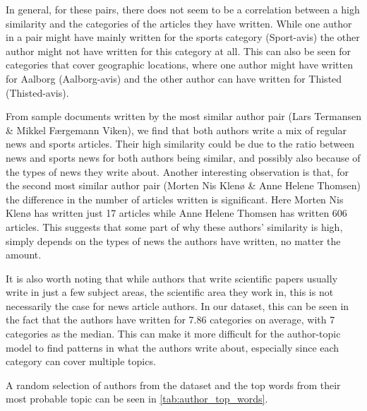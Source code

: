 In general, for these pairs, there does not seem to be a correlation between a high similarity and the categories of the articles they have written.
While one author in a pair might have mainly written for the sports category (Sport-avis) the other author might not have written for this category at all.
This can also be seen for categories that cover geographic locations, where one author might have written for Aalborg (Aalborg-avis) and the other author can have written for Thisted (Thisted-avis).

From sample documents written by the most similar author pair (Lars Termansen \& Mikkel Færgemann Viken), we find that both authors write a mix of regular news and sports articles.
Their high similarity could be due to the ratio between news and sports news for both authors being similar, and possibly also because of the types of news they write about.
Another interesting observation is that, for the second most similar author pair (Morten Nis Klenø \& Anne Helene Thomsen) the difference in the number of articles written is significant.
Here Morten Nis Klenø has written just 17 articles while Anne Helene Thomsen has written 606 articles.
This suggests that some part of why these authors' similarity is high, simply depends on the types of news the authors have written, no matter the amount.

It is also worth noting that while authors that write scientific papers usually write in just a few subject areas, the scientific area they work in, this is not necessarily the case for news article authors.
In our dataset, this can be seen in the fact that the authors have written for 7.86 categories on average, with 7 categories as the median.
This can make it more difficult for the author-topic model to find patterns in what the authors write about, especially since each category can cover multiple topics.

A random selection of authors from the dataset and the top words from their most probable topic can be seen in \autoref{tab:author_top_words}.


